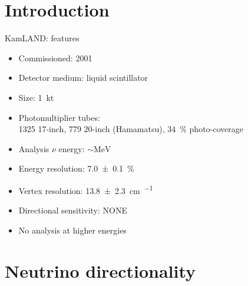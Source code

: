 \documentclass[14pt]{beamer}
\begin{document}
\section{Introduction}
\begin{frame}[t]{KamLAND: features}
	\begin{itemize}
		\item<1-> Commissioned: \num{2001}
		\item<1-> Detector medium: liquid scintillator
		\item<1-> Size: \SI{1}{\kilo\tonne}
		\item<1-> Photomultiplier tubes:\\
			\num{1325} 17-inch, \num{779} 20-inch
			(Hamamatsu), \SI{34}{\percent} photo-coverage
		\item<1-> Analysis $\nu$ energy: $\sim\si{\mega\electronvolt}$
		\item<1-> Energy resolution: \SI{7.0\pm0.1}{\percent}
		\item<1-> Vertex resolution:
			\SI{13.8\pm2.3}{\centi\meter\per{}}
		\item<2-> {\color{red}Directional sensitivity: NONE}
		\item<3-> {\color{red}No analysis at higher energies}
	\end{itemize}
\end{frame}

\section{Neutrino directionality}
\end{document}
